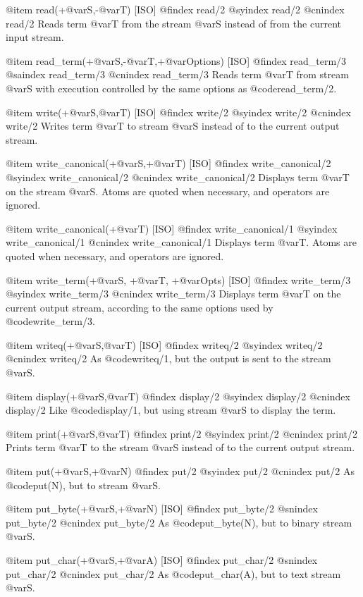 {{{{{@item read(+@var{S},-@var{T}) [ISO]
@findex read/2
@syindex read/2
@cnindex read/2
Reads term @var{T} from the stream @var{S} instead of from the current input
stream.

@item read_term(+@var{S},-@var{T},+@var{Options}) [ISO]
@findex read_term/3
@saindex read_term/3
@cnindex read_term/3
Reads term @var{T} from stream @var{S} with execution controlled by the
same options as @code{read_term/2}.

@item write(+@var{S},@var{T}) [ISO]
@findex write/2
@syindex write/2
@cnindex write/2
Writes term @var{T} to stream @var{S} instead of to the current output
stream.

@item write_canonical(+@var{S},+@var{T}) [ISO]
@findex write_canonical/2
@syindex write_canonical/2
@cnindex write_canonical/2
Displays term @var{T} on the stream @var{S}. Atoms are quoted when
necessary, and operators are ignored.

@item write_canonical(+@var{T}) [ISO]
@findex write_canonical/1
@syindex write_canonical/1
@cnindex write_canonical/1
Displays term @var{T}. Atoms are quoted when necessary, and operators
are ignored.

@item write_term(+@var{S}, +@var{T}, +@var{Opts}) [ISO]
@findex write_term/3
@syindex write_term/3
@cnindex write_term/3
Displays term @var{T} on the current output stream, according to the same
options used by @code{write_term/3}.

@item writeq(+@var{S},@var{T}) [ISO]
@findex writeq/2
@syindex writeq/2
@cnindex writeq/2
As @code{writeq/1}, but the output is sent to the stream @var{S}.

@item display(+@var{S},@var{T})
@findex display/2
@syindex display/2
@cnindex display/2
Like @code{display/1}, but using stream @var{S} to display the term.

@item print(+@var{S},@var{T})
@findex print/2
@syindex print/2
@cnindex print/2
Prints term @var{T} to the stream @var{S} instead of to the current output
stream.

@item put(+@var{S},+@var{N})
@findex put/2
@syindex put/2
@cnindex put/2
As @code{put(N)}, but to stream @var{S}.

@item put_byte(+@var{S},+@var{N}) [ISO]
@findex put_byte/2
@snindex put_byte/2
@cnindex put_byte/2
As @code{put_byte(N)}, but to binary stream @var{S}.

@item put_char(+@var{S},+@var{A}) [ISO]
@findex put_char/2
@snindex put_char/2
@cnindex put_char/2
As @code{put_char(A)}, but to text stream @var{S}.

}}}}}
